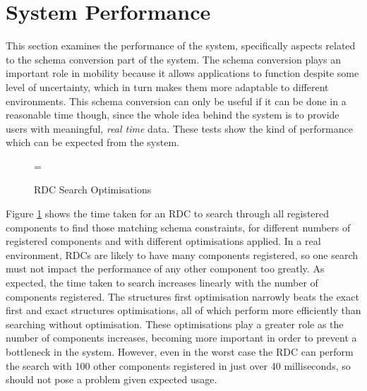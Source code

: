 \documentclass[12pt,twoside,notitlepage]{report}
\begin{document}



\section{System Performance}

This section examines the performance of the system, specifically aspects related to the schema conversion part of the system. 
The schema conversion plays an important role in mobility because it allows applications to function despite some level of uncertainty, which in turn makes them more adaptable to different environments. 
This schema conversion can only be useful if it can be done in a reasonable time though, since the whole idea behind the system is to provide users with meaningful, {\sl real time} data. 
These tests show the kind of performance which can be expected from the system. 

\begin{figure}[t]
\epsfxsize=\hsize
\centerline{}
\caption{RDC Search Optimisations}
\label{fig:rdc_search_optimisations}
\end{figure}

Figure \ref{fig:rdc_search_optimisations} shows the time taken for an RDC to search through all registered components to find those matching schema constraints, for different numbers of registered components and with different optimisations applied. 
In a real environment, RDCs are likely to have many components registered, so one search must not impact the performance of any other component too greatly.
As expected, the time taken to search increases linearly with the number of components registered. 
The structures first optimisation narrowly beats the exact first and exact structures optimisations, all of which perform more efficiently than searching without optimisation. 
These optimisations play a greater role as the number of components increases, becoming more important in order to prevent a bottleneck in the system. 
However, even in the worst case the RDC can perform the search with 100 other components registered in just over 40 milliseconds, so should not pose a problem given expected usage.
\end{document}
